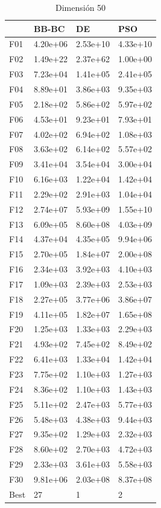 \begin{table}[H]
    \begin{minipage}{.5\linewidth}
      \caption{Dimensión 50}
      \centering
      \begin{tabular}{llll}
        \toprule
        {} &     BB-BC &        DE &       PSO \\
        \midrule
        F01  &  4.20e+06 &  2.53e+10 &  4.33e+10 \\
        F02  &  1.49e+22 &  2.37e+62 &  1.00e+00 \\
        F03  &  7.23e+04 &  1.41e+05 &  2.41e+05 \\
        F04  &  8.89e+01 &  3.86e+03 &  9.35e+03 \\
        F05  &  2.18e+02 &  5.86e+02 &  5.97e+02 \\
        F06  &  4.53e+01 &  9.23e+01 &  7.93e+01 \\
        F07  &  4.02e+02 &  6.94e+02 &  1.08e+03 \\
        F08  &  3.63e+02 &  6.14e+02 &  5.57e+02 \\
        F09  &  3.41e+04 &  3.54e+04 &  3.00e+04 \\
        F10  &  6.16e+03 &  1.22e+04 &  1.42e+04 \\
        F11  &  2.29e+02 &  2.91e+03 &  1.04e+04 \\
        F12  &  2.74e+07 &  5.93e+09 &  1.55e+10 \\
        F13  &  6.09e+05 &  8.60e+08 &  4.03e+09 \\
        F14  &  4.37e+04 &  4.35e+05 &  9.94e+06 \\
        F15  &  2.70e+05 &  1.84e+07 &  2.00e+08 \\
        F16  &  2.34e+03 &  3.92e+03 &  4.10e+03 \\
        F17  &  1.09e+03 &  2.39e+03 &  2.53e+03 \\
        F18  &  2.27e+05 &  3.77e+06 &  3.86e+07 \\
        F19  &  4.11e+05 &  1.82e+07 &  1.65e+08 \\
        F20  &  1.25e+03 &  1.33e+03 &  2.29e+03 \\
        F21  &  4.93e+02 &  7.45e+02 &  8.49e+02 \\
        F22  &  6.41e+03 &  1.33e+04 &  1.42e+04 \\
        F23  &  7.75e+02 &  1.10e+03 &  1.27e+03 \\
        F24  &  8.36e+02 &  1.10e+03 &  1.43e+03 \\
        F25  &  5.11e+02 &  2.47e+03 &  5.77e+03 \\
        F26  &  5.48e+03 &  4.38e+03 &  9.44e+03 \\
        F27  &  9.35e+02 &  1.29e+03 &  2.32e+03 \\
        F28  &  8.60e+02 &  2.70e+03 &  4.72e+03 \\
        F29  &  2.33e+03 &  3.61e+03 &  5.58e+03 \\
        F30  &  9.81e+06 &  2.03e+08 &  8.37e+08 \\
        Best &        27 &         1 &         2 \\
        \bottomrule
        \end{tabular}
        

\end{minipage}
\end{table}
